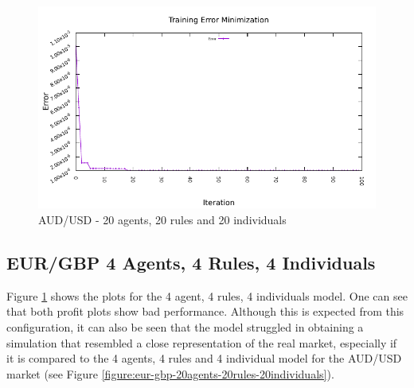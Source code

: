 \begin{figure}[htp]
  \medskip

  \includegraphics[width=.45\textwidth]{img/plots/aud_usd_h1-20agents-20rules-20ind-100gen_error_minimization.pdf}

  \caption{AUD/USD - 20 agents, 20 rules and 20 individuals}
  \label{figure:aud-usd-20agents-20rules-20individuals}
\end{figure}






\newpage

\subsection{EUR/GBP 4 Agents, 4 Rules, 4 Individuals}
\label{results:forecast-eur-gbp-4agents-4rules-4individuals}

Figure \ref{figure:aud-usd-20agents-20rules-20individuals} shows the plots for
the 4 agent, 4 rules, 4 individuals model. One can see that both profit plots
show bad performance. Although this is expected from this configuration, it can
also be seen that the model struggled in obtaining a simulation that resembled a
close representation of the real market, especially if it is compared to the 4
agents, 4 rules and 4 individual model for the AUD/USD market (see Figure
\ref{figure:eur-gbp-20agents-20rules-20individuals}).

